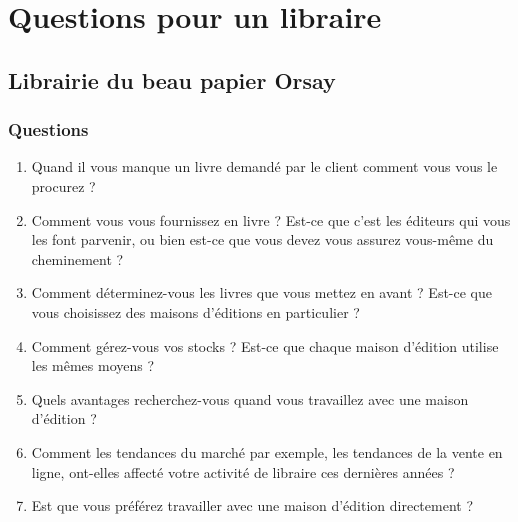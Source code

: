 \documentclass[a4paper, 13pt]{article}
\begin{document}
\section{Questions pour un libraire}
\subsection{Librairie du beau papier Orsay}
\subsubsection{Questions}
\begin{enumerate}
    \item Quand il vous manque un livre demandé par le client comment vous vous le procurez ?
    \item Comment vous vous fournissez en livre ? Est-ce que c'est les éditeurs qui vous les font parvenir, ou bien est-ce que vous devez vous assurez vous-même du cheminement ?
    \item Comment déterminez-vous les livres que vous mettez en avant ? Est-ce que vous choisissez des maisons d'éditions en particulier ?
    \item Comment gérez-vous vos stocks ? Est-ce que chaque maison d'édition utilise les mêmes moyens ?
    \item Quels avantages recherchez-vous quand vous travaillez avec une maison d'édition ?
    \item Comment les tendances du marché par exemple, les tendances de la vente en ligne, ont-elles affecté votre activité de libraire ces dernières années ?
    \item Est que vous préférez travailler avec une maison d'édition directement ?
\end{enumerate}
\end{document}
